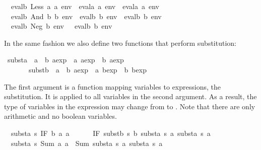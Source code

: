 \begin{isabellebody}
\isanewline
\ \ {\isachardoublequoteopen}evalb\ {\isacharparenleft}Less\ a{}\ a{}{\isacharparenright}\ env\ {\isacharequal}\ {\isacharparenleft}evala\ a{}\ env\ {\isacharless}\ evala\ a{}\ env{\isacharparenright}{\isachardoublequoteclose}\isanewline
\ \ {\isachardoublequoteopen}evalb\ {\isacharparenleft}And\ b{}\ b{}{\isacharparenright}\ env\ {\isacharequal}\ {\isacharparenleft}evalb\ b{}\ env\ {\isasymand}\ evalb\ b{}\ env{\isacharparenright}{\isachardoublequoteclose}\isanewline
\ \ {\isachardoublequoteopen}evalb\ {\isacharparenleft}Neg\ b{\isacharparenright}\ env\ {\isacharequal}\ {\isacharparenleft}{\isasymnot}\ evalb\ b\ env{\isacharparenright}{\isachardoublequoteclose}%
\begin{isamarkuptext}%
\noindent
In the same fashion we also define two functions that perform substitution:%
\end{isamarkuptext}%
\isamarkuptrue%
\isamarkupfalse%
\ substa\ {\isacharcolon}{\isacharcolon}\ {\isachardoublequoteopen}{\isacharparenleft}{\isacharprime}a\ {\isasymRightarrow}\ {\isacharprime}b\ aexp{\isacharparenright}\ {\isasymRightarrow}\ {\isacharprime}a\ aexp\ {\isasymRightarrow}\ {\isacharprime}b\ aexp{\isachardoublequoteclose}\isanewline
\ \ \ \ \ \ \ substb\ {\isacharcolon}{\isacharcolon}\ {\isachardoublequoteopen}{\isacharparenleft}{\isacharprime}a\ {\isasymRightarrow}\ {\isacharprime}b\ aexp{\isacharparenright}\ {\isasymRightarrow}\ {\isacharprime}a\ bexp\ {\isasymRightarrow}\ {\isacharprime}b\ bexp{\isachardoublequoteclose}%
\begin{isamarkuptext}%
\noindent
The first argument is a function mapping variables to expressions, the
substitution. It is applied to all variables in the second argument. As a
result, the type of variables in the expression may change from 
to . Note that there are only arithmetic and no boolean variables.%
\end{isamarkuptext}%
\isamarkuptrue%
\isamarkupfalse%
\isanewline
\ \ {\isachardoublequoteopen}substa\ s\ {\isacharparenleft}IF\ b\ a{}\ a{}{\isacharparenright}\ {\isacharequal}\isanewline
\ \ \ \ \ IF\ {\isacharparenleft}substb\ s\ b{\isacharparenright}\ {\isacharparenleft}substa\ s\ a{}{\isacharparenright}\ {\isacharparenleft}substa\ s\ a{}{\isacharparenright}{\isachardoublequoteclose}\isanewline
\ \ {\isachardoublequoteopen}substa\ s\ {\isacharparenleft}Sum\ a{}\ a{}{\isacharparenright}\ {\isacharequal}\ Sum\ {\isacharparenleft}substa\ s\ a{}{\isacharparenright}\ {\isacharparenleft}substa\ s\ a{}{\isacharparenright}{\isachardoublequoteclose}\isanewline

\end{isabellebody}
